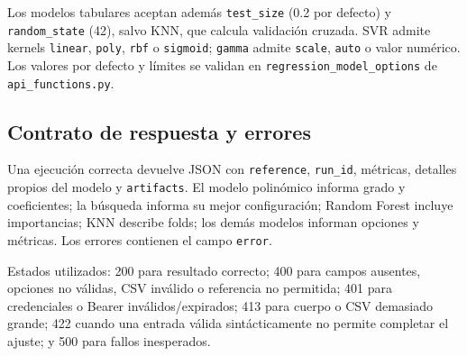 \documentclass[11pt,a4paper]{article}
\begin{document}
Los modelos tabulares aceptan además \texttt{test\_size} (0.2 por defecto) y \texttt{random\_state} (42), salvo KNN, que calcula validación cruzada. SVR admite kernels \texttt{linear}, \texttt{poly}, \texttt{rbf} o \texttt{sigmoid}; \texttt{gamma} admite \texttt{scale}, \texttt{auto} o valor numérico. Los valores por defecto y límites se validan en \texttt{regression\_model\_options} de \texttt{api\_functions.py}.

\subsection{Contrato de respuesta y errores}
Una ejecución correcta devuelve JSON con \texttt{reference}, \texttt{run\_id}, métricas, detalles propios del modelo y \texttt{artifacts}. El modelo polinómico informa grado y coeficientes; la búsqueda informa su mejor configuración; Random Forest incluye importancias; KNN describe folds; los demás modelos informan opciones y métricas. Los errores contienen el campo \texttt{error}.

Estados utilizados: 200 para resultado correcto; 400 para campos ausentes, opciones no válidas, CSV inválido o referencia no permitida; 401 para credenciales o Bearer inválidos/expirados; 413 para cuerpo o CSV demasiado grande; 422 cuando una entrada válida sintácticamente no permite completar el ajuste; y 500 para fallos inesperados.
\end{document}
